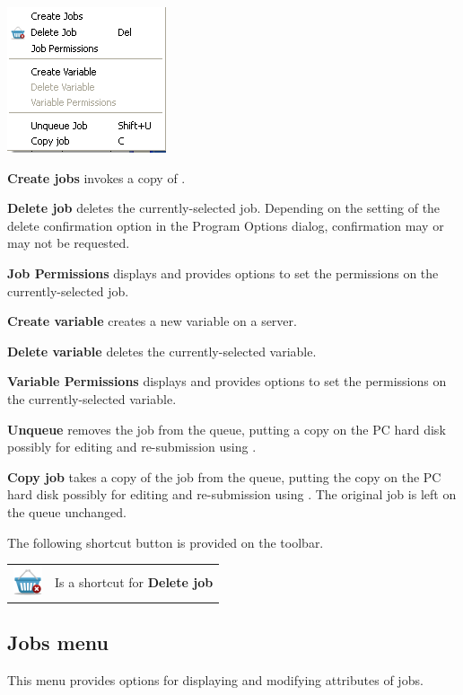 \includegraphics{img/btqwcredelmenu.png}

\textbf{Create jobs} invokes a copy of .

\textbf{Delete job} deletes the currently-selected job. Depending on the setting of the delete confirmation option in the
Program Options dialog, confirmation may or may not be requested.

\textbf{Job Permissions} displays and provides options to set the permissions on the currently-selected job.

\textbf{Create variable} creates a new variable on a server.

\textbf{Delete variable} deletes the currently-selected variable.

\textbf{Variable Permissions} displays and provides options to set the permissions on the currently-selected variable.

\textbf{Unqueue} removes the job from the queue, putting a copy on the PC hard disk possibly for editing and re-submission using
.

\textbf{Copy job} takes a copy of the job from the queue, putting the copy on the PC hard disk possibly for editing and re-submission using . The original job is left on the queue unchanged.

The following shortcut button is provided on the toolbar.

\begin{tabular}{l p{12cm}}
\includegraphics{img/btqwdeljob.png} & Is a shortcut for \textbf{Delete job}\\
\end{tabular}

\subsection{Jobs menu}
This menu provides options for displaying and modifying attributes of jobs.

